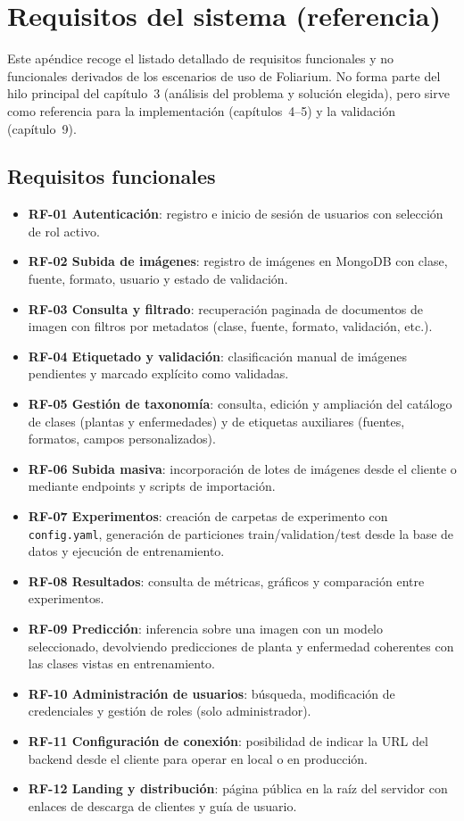 \documentclass[11pt,spanish,listoffigures,listoftables]{tfgetsinf}
\begin{document}
\chapter{Requisitos del sistema (referencia)}
\label{ap:requisitos}

Este apéndice recoge el listado detallado de requisitos funcionales y no funcionales derivados de los escenarios de uso de Foliarium. No forma parte del hilo principal del capítulo~3 (análisis del problema y solución elegida), pero sirve como referencia para la implementación (capítulos~4--5) y la validación (capítulo~9).

\section{Requisitos funcionales}

\begin{itemize}
    \item \textbf{RF-01 Autenticación}: registro e inicio de sesión de usuarios con selección de rol activo.
    \item \textbf{RF-02 Subida de imágenes}: registro de imágenes en MongoDB con clase, fuente, formato, usuario y estado de validación.
    \item \textbf{RF-03 Consulta y filtrado}: recuperación paginada de documentos de imagen con filtros por metadatos (clase, fuente, formato, validación, etc.).
    \item \textbf{RF-04 Etiquetado y validación}: clasificación manual de imágenes pendientes y marcado explícito como validadas.
    \item \textbf{RF-05 Gestión de taxonomía}: consulta, edición y ampliación del catálogo de clases (plantas y enfermedades) y de etiquetas auxiliares (fuentes, formatos, campos personalizados).
    \item \textbf{RF-06 Subida masiva}: incorporación de lotes de imágenes desde el cliente o mediante endpoints y scripts de importación.
    \item \textbf{RF-07 Experimentos}: creación de carpetas de experimento con \texttt{config.yaml}, generación de particiones train/validation/test desde la base de datos y ejecución de entrenamiento.
    \item \textbf{RF-08 Resultados}: consulta de métricas, gráficos y comparación entre experimentos.
    \item \textbf{RF-09 Predicción}: inferencia sobre una imagen con un modelo seleccionado, devolviendo predicciones de planta y enfermedad coherentes con las clases vistas en entrenamiento.
    \item \textbf{RF-10 Administración de usuarios}: búsqueda, modificación de credenciales y gestión de roles (solo administrador).
    \item \textbf{RF-11 Configuración de conexión}: posibilidad de indicar la URL del backend desde el cliente para operar en local o en producción.
    \item \textbf{RF-12 Landing y distribución}: página pública en la raíz del servidor con enlaces de descarga de clientes y guía de usuario.
\end{itemize}
\end{document}
